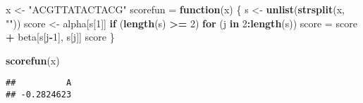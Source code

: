 \documentclass[]{article}
\newenvironment{Shaded}{\begin{snugshade}}{\end{snugshade}}
\newcommand{\KeywordTok}[1]{\textcolor[rgb]{0.13,0.29,0.53}{\textbf{#1}}}
\newcommand{\DecValTok}[1]{\textcolor[rgb]{0.00,0.00,0.81}{#1}}
\newcommand{\StringTok}[1]{\textcolor[rgb]{0.31,0.60,0.02}{#1}}
\newcommand{\ControlFlowTok}[1]{\textcolor[rgb]{0.13,0.29,0.53}{\textbf{#1}}}
\newcommand{\OperatorTok}[1]{\textcolor[rgb]{0.81,0.36,0.00}{\textbf{#1}}}
\newcommand{\NormalTok}[1]{#1}
\begin{document}
\begin{Shaded}
\begin{Highlighting}[]
\NormalTok{x <-}\StringTok{ "ACGTTATACTACG"}
\NormalTok{scorefun =}\StringTok{ }\ControlFlowTok{function}\NormalTok{(x) \{}
\NormalTok{  s <-}\StringTok{ }\KeywordTok{unlist}\NormalTok{(}\KeywordTok{strsplit}\NormalTok{(x, }\StringTok{""}\NormalTok{))}
\NormalTok{  score <-}\StringTok{ }\NormalTok{alpha[s[}\DecValTok{1}\NormalTok{]]}
  \ControlFlowTok{if}\NormalTok{ (}\KeywordTok{length}\NormalTok{(s) }\OperatorTok{>=}\StringTok{ }\DecValTok{2}\NormalTok{)}
    \ControlFlowTok{for}\NormalTok{ (j }\ControlFlowTok{in} \DecValTok{2}\OperatorTok{:}\KeywordTok{length}\NormalTok{(s))}
\NormalTok{      score =}\StringTok{ }\NormalTok{score }\OperatorTok{+}\StringTok{ }\NormalTok{beta[s[j}\OperatorTok{-}\DecValTok{1}\NormalTok{], s[j]]}
\NormalTok{  score}
\NormalTok{\}}

\KeywordTok{scorefun}\NormalTok{(x)}
\end{Highlighting}
\end{Shaded}

\begin{verbatim}
##          A 
## -0.2824623
\end{verbatim}
\end{document}
